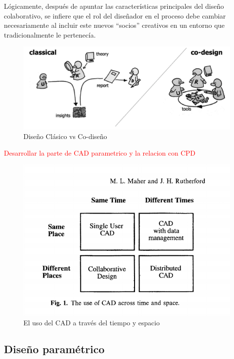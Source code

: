 Lógicamente, después de apuntar las características principales del diseño colaborativo, se infiere que el rol del diseñador en el proceso debe cambiar necesariamente al incluir este nuevos “socios” creativos en un entorno que tradicionalmente le pertenecía. \cite{Huerta2013}

\begin{figure}
\centering
\includegraphics[width=12cm]{Img/CPD/1-CO.png}
\caption[(optional short caption)]{\label{us_figure} Diseño Clásico vs Co-diseño}
\end{figure}

\textcolor{red}{Desarrollar la parte de CAD parametrico y la relacion con CPD}

\begin{figure}
\centering
\includegraphics[width=12cm]{Img/CPD/2-CAD.png}
\caption[(optional short caption)]{\label{us_figure} El uso del CAD a través del tiempo y espacio}
\end{figure}


\subsection{Diseño paramétrico}


